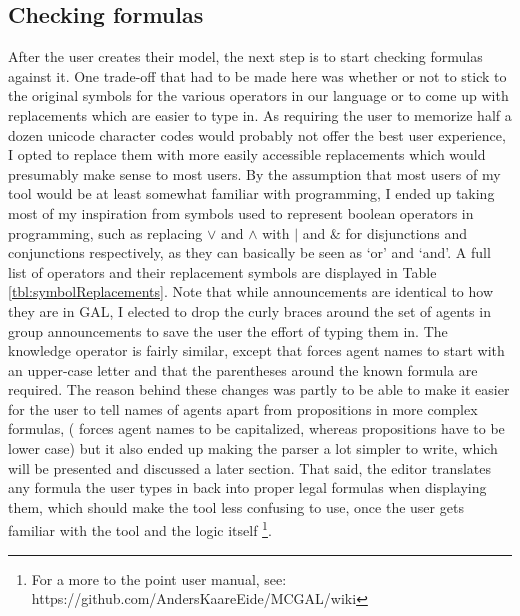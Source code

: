 \subsection{Checking formulas}

After the user creates their model, the next step is to start checking formulas against it. One trade-off that had to be made here was whether or not to stick to the original symbols for the various operators in our language or to come up with replacements which are easier to type in. As requiring the user to memorize half a dozen unicode character codes would probably not offer the best user experience, I opted to replace them with more easily accessible replacements which would presumably make sense to most users. By the assumption that most users of my tool would be at least somewhat familiar with programming, I ended up taking most of my inspiration from symbols used to represent boolean operators in programming, such as replacing $\vee$ and $\wedge$ with $|$ and $\&$ for disjunctions and conjunctions respectively, as they can basically be seen as `or' and `and'. A full list of operators and their replacement symbols are displayed in Table \ref{tbl:symbolReplacements}. Note that while announcements are identical to how they are in GAL, I elected to drop the curly braces around the set of agents in group announcements to save the user the effort of typing them in. The knowledge operator is fairly similar, except that \cname{} forces agent names to start with an upper-case letter and that the parentheses around the known formula are required. The reason behind these changes was partly to be able to make it easier for the user to tell names of agents apart from propositions in more complex formulas, (\cname{} forces agent names to be capitalized, whereas propositions have to be lower case) but it also ended up making the parser a lot simpler to write, which will be presented and discussed a later section. That said, the editor translates any formula the user types in back into proper legal formulas when displaying them, which should make the tool less confusing to use, once the user gets familiar with the tool and the logic itself \footnote{For a more to the point user manual, see: https://github.com/AndersKaareEide/MCGAL/wiki}.


